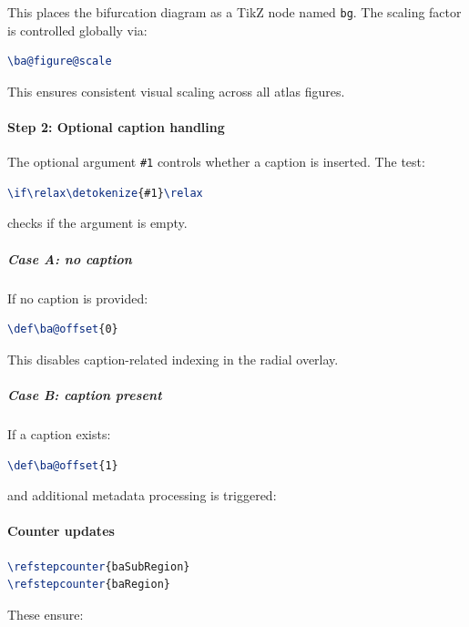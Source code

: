 This places the bifurcation diagram as a TikZ node named \texttt{bg}. The scaling factor is controlled globally via:

\begin{lstlisting}[language=LaTeX]
\ba@figure@scale
\end{lstlisting}

This ensures consistent visual scaling across all atlas figures.



\paragraph{Step 2: Optional caption handling}

The optional argument \texttt{\#1} controls whether a caption is inserted. The test:

\begin{lstlisting}[language=LaTeX]
\if\relax\detokenize{#1}\relax
\end{lstlisting}

checks if the argument is empty.



\subparagraph{Case A: no caption}

If no caption is provided:

\begin{lstlisting}[language=LaTeX]
\def\ba@offset{0}
\end{lstlisting}

This disables caption-related indexing in the radial overlay.



\subparagraph{Case B: caption present}

If a caption exists:

\begin{lstlisting}[language=LaTeX]
\def\ba@offset{1}
\end{lstlisting}

and additional metadata processing is triggered:

\paragraph{Counter updates}

\begin{lstlisting}[language=LaTeX]
\refstepcounter{baSubRegion}
\refstepcounter{baRegion}
\end{lstlisting}

These ensure:

